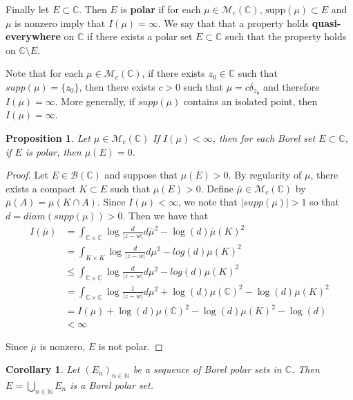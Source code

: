 \documentclass{amsart}
\newtheorem{prop}[thm]{Proposition}
\newtheorem{cor}[thm]{Corollary}
\newcommand{\N}{\mathbb{N}}
\newcommand{\C}{\mathbb{C}}
\newcommand{\MCM}{\mathcal{M}}
\newcommand{\MCB}{\mathcal{B}}
\begin{document}
Finally let $E \subset \C$. Then $E$ is \textbf{polar} if for each $\mu \in \MCM_c(\C)$, $\mathrm{supp}(\mu) \subset E$ and $\mu$ is nonzero imply that $I(\mu) = \infty$.  We say that that a property holds \textbf{quasi-everywhere} on $\C$ if there exists a polar set $E \subset \C$ such that the property holds on $\C\setminus E$.

Note that for each $\mu \in \MCM_c(\C)$, if there exists $z_0 \in \C$ such that $supp(\mu) = \{z_0\}$, then there exists $c>0$ such that $\mu = c\delta_{z_0}$ and therefore $I(\mu) = \infty$. More generally, if $supp(\mu)$ contains an isolated point, then $I(\mu) = \infty$.

\begin{prop}

Let $\mu \in \MCM_c(\C)$ If $I(\mu) < \infty$, then for each Borel set $E \subset \C$, if $E$ is polar, then $\mu(E)=0$.

\end{prop}

\begin{proof}
Let $E \in \MCB(\C)$ and suppose that $\mu(E) > 0$. By regularity of $\mu$, there exists a compact $K \subset E$ such that $\mu(E) >0$. Define $\overline{\mu} \in \MCM_c(\C)$ by $\overline{\mu}(A)= \mu(K\cap A)$. Since $I(\mu)< \infty$, we note that $|supp(\mu)| > 1$ so that $d = diam(supp(\mu)) >0$. Then we have that 
\begin{align*}
I(\overline{\mu}) 
&=\int_{\C \times \C} \log \frac{d}{|z-w|}d\overline{\mu}^2 -\log(d)\overline{\mu}(K)^2\\
&= \int_{K \times K} \log\frac{d}{|z-w|}d\mu^2 - log(d)\mu(K)^2\\
&\leq \int_{\C \times \C} \log \frac{d}{|z-w|}d\mu^2 - log(d)\mu(K)^2\\
&=\int_{\C \times \C} \log \frac{1}{|z-w|} d\mu^2 + \log(d)\mu(\C)^2 - \log(d)\mu(K)^2\\
&= I(\mu) + \log(d)\mu(\C)^2 - \log(d)\mu(K)^2 - \log(d)\\
& < \infty
\end{align*}

Since $\overline{\mu}$ is nonzero, $E$ is not polar.

\end{proof}

\begin{cor}
Let $(E_n)_{n \in \N}$ be a sequence of Borel polar sets in $\C$. Then $E = \bigcup\limits_{n \in \N}E_n$ is a Borel polar set. 
\end{cor}
\end{document}
